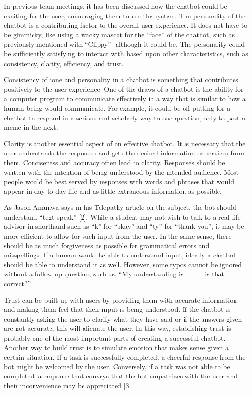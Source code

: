 \documentclass[titlepage, 12pt]{article}
\begin{document}
In previous team meetings, it has been discussed how the chatbot could be exciting for the user, encouraging them to use the system. The personality of the chatbot is a contributing factor to the overall user experience. It does not have to be gimmicky, like using a wacky mascot for the “face” of the chatbot, such as previously mentioned with “Clippy”- although it could be. The personality could be sufficiently satisfying to interact with based upon other characteristics, such as consistency, clarity, efficiency, and trust.
 
Consistency of tone and personality in a chatbot is something that contributes positively to the user experience. One of the draws of a chatbot is the ability for a computer program to communicate effectively in a way that is similar to how a human being would communicate. For example, it could be off-putting for a chatbot to respond in a serious and scholarly way to one question, only to post a meme in the next.
 
Clarity is another essential aspect of an effective chatbot. It is necessary that the user understands the responses and gets the desired information or services from them. Conciseness and accuracy often lead to clarity. Responses should be written with the intention of being understood by the intended audience. Most people would be best served by responses with words and phrases that would appear in day-to-day life and as little extraneous information as possible.
 
As Jason Amunwa says in his Telepathy article on the subject, the bot should understand “text-speak” [2]. While a student may not wish to talk to a real-life advisor in shorthand such as “k” for “okay” and “ty” for “thank you”, it may be more efficient to allow for such input from the user. In the same sense, there should be as much forgiveness as possible for grammatical errors and misspellings. If a human would be able to understand input, ideally a chatbot should be able to understand it as well. However, some typos cannot be ignored without a follow up question, such as, “My understanding is \_\_\_, is that correct?”
 
Trust can be built up with users by providing them with accurate information and making them feel that their input is being understood. If the chatbot is constantly asking the user to clarify what they have said or if the answers given are not accurate, this will alienate the user. In this way, establishing trust is probably one of the most important parts of creating a successful chatbot. Another way to build trust is to simulate emotion that makes sense given a certain situation. If a task is successfully completed, a cheerful response from the bot might be welcomed by the user. Conversely, if a task was not able to be completed, a response that conveys that the bot empathizes with the user and their inconvenience may be appreciated [3].
\end{document}
